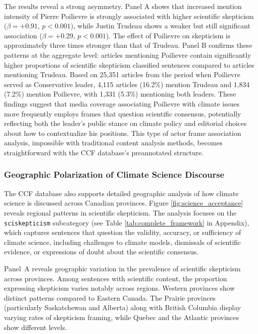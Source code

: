 \documentclass[12pt]{article}
\renewcommand\_{\texttt{\detokenize{_}\allowbreak}}
\begin{document}
The results reveal a strong asymmetry. Panel A shows that increased mention intensity of Pierre Poilievre is strongly associated with higher scientific skepticism ($\beta=+0.91$, $p<0.001$), while Justin Trudeau shows a weaker but still significant association ($\beta=+0.29$, $p<0.001$). The effect of Poilievre on skepticism is approximately three times stronger than that of Trudeau. Panel B confirms these patterns at the aggregate level: articles mentioning Poilievre contain significantly higher proportions of scientific skepticism classified sentences compared to articles mentioning Trudeau. Based on 25,351 articles from the period when Poilievre served as Conservative leader, 4,115 articles (16.2\%) mention Trudeau and 1,834 (7.2\%) mention Poilievre, with 1,331 (5.3\%) mentioning both leaders. These findings suggest that media coverage associating Poilievre with climate issues more frequently employs frames that question scientific consensus, potentially reflecting both the leader's public stance on climate policy and editorial choices about how to contextualize his positions. This type of actor frame association analysis, impossible with traditional content analysis methods, becomes straightforward with the CCF database's preannotated structure.

\subsubsection{Geographic Polarization of Climate Science Discourse}

The CCF database also supports detailed geographic analysis of how climate science is discussed across Canadian provinces. Figure \ref{fig:science_acceptance} reveals regional patterns in scientific skepticism. The analysis focuses on the \texttt{sci\_skepticism} subcategory (see Table \ref{tab:complete_framework} in Appendix), which captures sentences that question the validity, accuracy, or sufficiency of climate science, including challenges to climate models, dismissals of scientific evidence, or expressions of doubt about the scientific consensus.

Panel~A reveals geographic variation in the prevalence of scientific skepticism across provinces. Among sentences with scientific content, the proportion expressing skepticism varies notably across regions. Western provinces show distinct patterns compared to Eastern Canada. The Prairie provinces (particularly Saskatchewan and Alberta) along with British Columbia display varying rates of skepticism framing, while Quebec and the Atlantic provinces show different levels.
\end{document}
